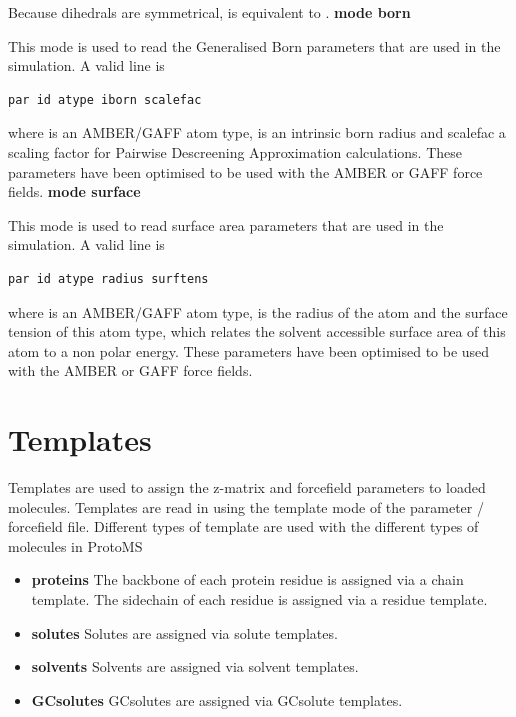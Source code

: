 \documentclass[letterpaper,10pt,english]{manual}
\begin{document}
Because dihedrals are symmetrical,  is equivalent to .
\textbf{mode born}

This mode is used to read the Generalised Born parameters that are used in the simulation. A valid line is

\begin{Verbatim}[commandchars=@\[\]]
par id atype iborn scalefac
\end{Verbatim}

where  is an AMBER/GAFF atom type,  is an intrinsic born radius and scalefac a scaling factor for Pairwise Descreening Approximation calculations. These parameters have been optimised to be used with the AMBER or GAFF force fields.
\textbf{mode surface}

This mode is used to read surface area parameters that are used in the simulation. A valid line is

\begin{Verbatim}[commandchars=@\[\]]
par id atype radius surftens
\end{Verbatim}

where  is an AMBER/GAFF atom type,  is the radius of the atom and  the surface tension of this atom type, which relates the solvent accessible surface area of this atom to a non polar energy. These parameters have been optimised to be used with the AMBER or GAFF force fields.
\hypertarget{temref}{}

\section{Templates}

Templates are used to assign the z-matrix and forcefield parameters to loaded molecules. Templates are read in using the template mode of the parameter / forcefield file. Different types of template are used with the different types of molecules in ProtoMS
\begin{itemize}
\item {} 
\textbf{proteins} The backbone of each protein residue is assigned via a chain template. The sidechain of each residue is assigned via a residue template.

\item {} 
\textbf{solutes} Solutes are assigned via solute templates.

\item {} 
\textbf{solvents} Solvents are assigned via solvent templates.

\item {} 
\textbf{GCsolutes} GCsolutes are assigned via GCsolute templates.

\end{itemize}
\end{document}
